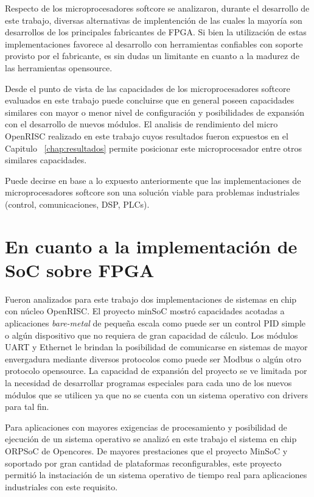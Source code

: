 Respecto de los microprocesadores softcore se analizaron, durante el desarrollo de este trabajo, diversas alternativas de implentención de las cuales
la mayoría son desarrollos de los principales fabricantes de FPGA. Si bien la utilización de estas implementaciones favorece al desarrollo con
herramientas confiables con soporte provisto por el fabricante, es sin dudas un limitante en cuanto a la madurez de las herramientas opensource.

Desde el punto de vista de las capacidades de los microprocesadores softcore evaluados en este trabajo puede concluirse que en general poseen
capacidades similares con mayor o menor nivel de configuración y posibilidades de expansión con el desarrollo de nuevos módulos. El analisis de
rendimiento del micro OpenRISC realizado en este trabajo cuyos resultados fueron expuestos en el Capitulo ~\ref {chap:resultados} permite posicionar
este microprocesador entre otros similares capacidades.

Puede decirse en base a lo expuesto anteriormente que las implementaciones de microprocesadores softcore son una solución viable para problemas
industriales (control, comunicaciones, DSP, PLCs). %
 
	\section{En cuanto a la implementación de SoC sobre FPGA} 

Fueron analizados para este trabajo dos implementaciones de sistemas en chip con núcleo OpenRISC. El proyecto minSoC mostró capacidades acotadas a
aplicaciones \textit{bare-metal} de pequeña escala como puede ser un control PID simple o algún dispositivo que no requiera de gran capacidad de
cálculo. Los módulos UART y Ethernet le brindan la posibilidad de comunicarse en sistemas de mayor envergadura mediante diversos protocolos como puede
ser Modbus o algún otro protocolo opensource. La capacidad de expansión del proyecto se ve limitada por la necesidad de desarrollar programas
especiales para cada uno de los nuevos módulos que se utilicen ya que no se cuenta con un sistema operativo con drivers para tal fin.

Para aplicaciones con mayores exigencias de procesamiento y posibilidad de ejecución de un sistema operativo se analizó en este trabajo el sistema en
chip ORPSoC de Opencores. De mayores prestaciones que el proyecto MinSoC y soportado por gran cantidad de plataformas reconfigurables, este proyecto
permitió la instaciación de un sistema operativo de tiempo real para aplicaciones industriales con este requisito.
		
